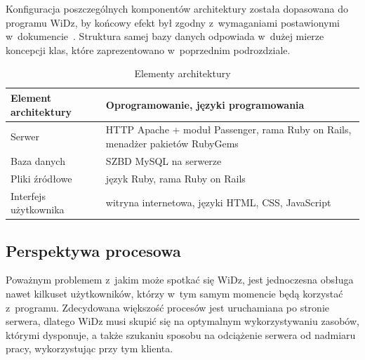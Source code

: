 \documentclass[12pt,leqno,twoside]{mwart}
\begin{document}
\indent Konfiguracja poszczególnych komponentów architektury została dopasowana do programu WiDz, by końcowy efekt był zgodny z~wymaganiami postawionymi w~dokumencie~\cite{WYM}. Struktura samej bazy danych odpowiada w~dużej mierze koncepcji klas, które zaprezentowano w~poprzednim podrozdziale.
\begin{table}[h]
	\centering
	\caption{Elementy architektury}
		\begin{tabular}{|l|p{10cm}|}
		\hline
		\textbf{Element architektury} & \textbf{Oprogramowanie, języki programowania} \\ \hline
		Serwer & HTTP Apache + moduł Passenger, rama Ruby on Rails, menadżer pakietów RubyGems \\ \hline
		Baza danych & SZBD MySQL na serwerze \\ \hline
		Pliki źródłowe & język Ruby, rama Ruby on Rails \\ \hline
		Interfejs użytkownika & witryna internetowa, języki HTML, CSS, JavaScript \\ \hline
		\end{tabular}
	\label{elementy_architektury}
\end{table}

\subsection{Perspektywa procesowa}
\noindent Poważnym problemem z~jakim może spotkać się WiDz, jest jednoczesna obsługa nawet kilkuset użytkowników, którzy w~tym samym momencie będą korzystać z~programu. Zdecydowana większość procesów jest uruchamiana po stronie serwera, dlatego WiDz musi skupić się na optymalnym wykorzystywaniu zasobów, którymi dysponuje, a także szukaniu sposobu na odciążenie serwera od nadmiaru pracy, wykorzystując przy tym klienta. 
\end{document}
